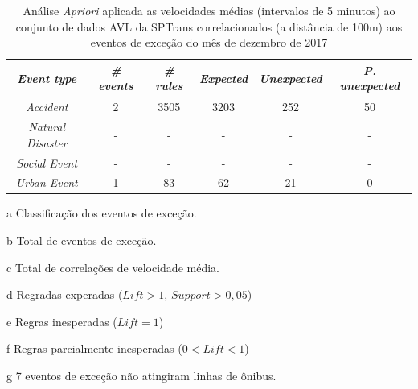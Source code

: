 \documentclass[
	12pt,				%
	oneside,			%
	a4paper,			%
	english,			%
	brazil				%
	]{abntex2ppgsi}
\begin{document}
\begin{apendicesenv}
\begin{table}[!htb]
\centering
\begin{threeparttable}
\caption {Análise \textit{Apriori} aplicada as velocidades médias (intervalos de 5 minutos) ao conjunto de dados AVL da SPTrans correlacionados (a distância de 100m) aos eventos de exceção do mês de dezembro de 2017}
\label {tab:aprioriFull}
\begin{tabular}{c|c|c|c|c|c}
\hline
\textbf{\textit{Event type}}\tnote{a} & \textbf{\textit{\# events}}\tnote{b} & \textit{\textbf{\# rules}}\tnote{c} & \textbf{\textit{Expected}}\tnote{d} & \textbf{\textit{Unexpected}}\tnote{e} & \textbf{\textit{P. unexpected}}\tnote{f}   \\
\hline
\textit{Accident} & 2 & 3505 & 3203 & 252 & 50 \\
\textit{Natural Disaster} & - & - & - & - & - \\
\textit{Social Event} & - & - & - & - & - \\
\textit{Urban Event} & 1 & 83 & 62 & 21 & 0 \\
\hline
\end{tabular}
\begin{tablenotes}
            \item[a] Classificação dos eventos de exceção.
            \item[b] Total de eventos de exceção.
            \item[c] Total de correlações de velocidade média.
            \item[d] Regradas experadas ($Lift > 1$, $Support > 0,05$)
            \item[e] Regras inesperadas ($Lift = 1$)
            \item[f] Regras parcialmente inesperadas ($0 < Lift < 1$)
            \item[g] 7 eventos de exceção não atingiram linhas de ônibus.
        \end{tablenotes}
\end{threeparttable}
\end{table}

\end{apendicesenv}
\end{document}
